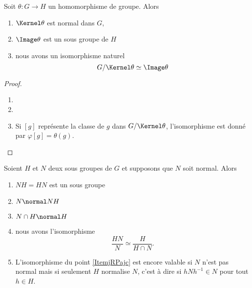 \begin{theorem}        \label{ThoPremierthoisomo}
    Soit \( \theta\colon G\to H\) un homomorphisme de groupe. Alors
    \begin{enumerate}
        \item
            \( \Kernel\theta\) est normal dans \( G\),
        \item
            \( \Image \theta\) est un sous groupe de \( H\)
        \item   \label{ItemWLCLdk}
            nous avons un isomorphisme naturel
            \begin{equation}
                G/\Kernel\theta\simeq \Image\theta
            \end{equation}
    \end{enumerate}
\end{theorem}

\begin{proof}
    \begin{enumerate}
        \item
        \item
        \item
            Si \( [g]\) représente la classe de \( g\) dans \( G/\Kernel\theta\), l'isomorphisme est donné par \( \varphi[g]=\theta(g)\).
    \end{enumerate}
\end{proof}


\begin{theorem}
    Soient \( H\) et \( N\) deux sous groupes de \( G\) et supposons que \( N\) soit normal. Alors
    \begin{enumerate}
        \item
            \( NH=HN\) est un sous groupe
        \item
            \( N\normal NH\)
        \item
            \( N\cap H\normal H\)
        \item\label{ItemjRPajc}
            nous avons l'isomorphisme
            \begin{equation}
                \frac{ HN }{ N }\simeq\frac{ H }{ H\cap N }.
            \end{equation}
        \item   \label{ItembgDQEN}
            L'isomorphisme du point \ref{ItemjRPajc} est encore valable si \( N\) n'est pas normal mais si seulement \( H\) normalise \( N\), c'est à dire si \( hNh^{-1}\in N\) pour tout \( h\in H\).
    \end{enumerate}
\end{theorem}

